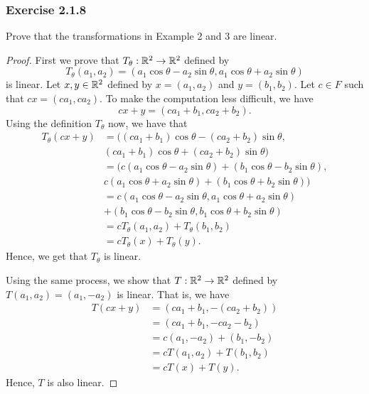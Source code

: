 \subsubsection{Exercise 2.1.8} Prove that the transformations in Example 2 and 3 are linear.
\begin{proof}
    First we prove that \( T_{\theta}: \mathbb{R}^{2} \to \mathbb{R}^{2} \) defined by 
    \[  T_{\theta}(a_{1}, a_{2}) = (a_{1}\cos \theta - a_{2} \sin \theta, a_{1} \cos \theta + a_{2} \sin \theta) \]
    is linear. Let \( x,y \in \mathbb{R}^{2}  \) defined by \( x = (a_{1}, a_{2}) \) and \( y = (b_{1}, b_{2}) \). Let \( c \in F  \) such that \( cx = (ca_{1}, ca_{2}) \). To make the computation less difficult, we have
    \[  cx + y = (ca_{1} + b_{1}, ca_{2} + b_{2}). \]
    Using the definition \( T_{\theta} \) now, we have that 
    \begin{align*}
        T_{\theta}(cx + y) &= ((ca_{1} + b_{1})\cos \theta - (ca_{2} + b_{2}) \sin \theta,  \\
                           &(ca_{1} + b_{1}) \cos \theta + (ca_{2} + b_{2}) \sin \theta ) \\
                           &= (c (a_{1}\cos \theta  - a_{2} \sin \theta) + (b_{1} \cos \theta - b_{2} \sin \theta ), \\
                           &c ( a_{1} \cos \theta + a_{2} \sin \theta ) + (b_{1} \cos \theta + b_{2} \sin \theta)           ) \\
                           &= c (a_{1} \cos \theta - a_{2} \sin \theta, a_{1} \cos \theta + a_{2} \sin \theta)  \\
                           &+ (b_{1} \cos \theta - b_{2} \sin \theta , b_{1} \cos \theta + b_{2} \sin \theta) \\
                           &= c T_{\theta}(a_{1}, a_{2}) + T_{\theta}(b_{1}, b_{2}) \\
                           &= c T_{\theta}(x) + T_{\theta}(y).
    \end{align*}
    Hence, we get that \( T_{\theta} \) is linear.

    Using the same process, we show that \( T: \mathbb{R}^{2} \to \mathbb{R}^{2}  \) defined by \( T(a_{1}, a_{2}) = (a_{1}, - a_{2})\) is linear. That is, we have
    \begin{align*}
        T(cx + y) &= (ca_{1} + b_{1}, - (ca_{2} + b_{2})) \\
                  &= (ca_{1} + b_{1}, -ca_{2} - b_{2}) \\ 
                  &= c(a_{1}, -a_{2}) + (b_{1}, -b_{2}) \\
                  &= c T(a_{1}, a_{2}) + T(b_{1}, b_{2}) \\
                  &= cT(x) + T(y).
    \end{align*}
    Hence, \( T  \) is also linear.


\end{proof}
